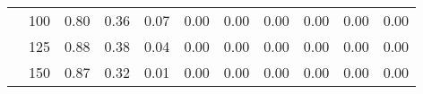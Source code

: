 \begin{table}[t]
\begin{center}
\begin{subtable}[c]{\textwidth}
\begin{center}
\begin{tabular}{rcccccccccc}
                                        & \multicolumn{1}{c|}{100}  & \num{0.80}  & \num{0.36}  & \num{0.07}  & \num{0.00}  & \num{0.00}  & \num{0.00}  & \num{0.00}  & \num{0.00}  & \num{0.00}  \\
                                        & \multicolumn{1}{c|}{125}  & \num{0.88}  & \num{0.38}  & \num{0.04}  & \num{0.00}  & \num{0.00}  & \num{0.00}  & \num{0.00}  & \num{0.00}  & \num{0.00}  \\
                                        & \multicolumn{1}{c|}{150}  & \num{0.87}  & \num{0.32}  & \num{0.01}  & \num{0.00}  & \num{0.00}  & \num{0.00}  & \num{0.00}  & \num{0.00}  & \num{0.00}  \\
                                    \end{tabular}
            \end{center}
        \end{subtable}

        \vspace{5mm}


\end{center}
\end{table}
